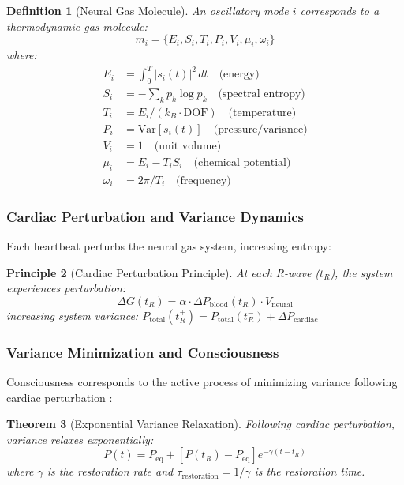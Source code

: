 \documentclass[12pt,twocolumn]{article}
\newtheorem{theorem}{Theorem}[section]
\newtheorem{definition}[theorem]{Definition}
\newtheorem{principle}[theorem]{Principle}
\theoremstyle{remark}
\begin{document}
\begin{definition}[Neural Gas Molecule]
An oscillatory mode $i$ corresponds to a thermodynamic gas molecule:
\begin{equation}
m_i = \{E_i, S_i, T_i, P_i, V_i, \mu_i, \omega_i\}
\end{equation}
where:
\begin{align}
E_i &= \int_0^T |s_i(t)|^2 \, dt \quad \text{(energy)} \\
S_i &= -\sum_k p_k \log p_k \quad \text{(spectral entropy)} \\
T_i &= E_i / (k_B \cdot \text{DOF}) \quad \text{(temperature)} \\
P_i &= \text{Var}[s_i(t)] \quad \text{(pressure/variance)} \\
V_i &= 1 \quad \text{(unit volume)} \\
\mu_i &= E_i - T_i S_i \quad \text{(chemical potential)} \\
\omega_i &= 2\pi/T_i \quad \text{(frequency)}
\end{align}
\end{definition}

\subsubsection{Cardiac Perturbation and Variance Dynamics}

Each heartbeat perturbs the neural gas system, increasing entropy:

\begin{principle}[Cardiac Perturbation Principle]
At each R-wave ($t_R$), the system experiences perturbation:
\begin{equation}
\Delta G(t_R) = \alpha \cdot \Delta P_{\text{blood}}(t_R) \cdot V_{\text{neural}}
\end{equation}
increasing system variance: $P_{\text{total}}(t_R^+) = P_{\text{total}}(t_R^-) + \Delta P_{\text{cardiac}}$
\end{principle}

\subsubsection{Variance Minimization and Consciousness}

Consciousness corresponds to the active process of minimizing variance following cardiac perturbation \citep{bennett1987demons}:

\begin{theorem}[Exponential Variance Relaxation]
Following cardiac perturbation, variance relaxes exponentially:
\begin{equation}
P(t) = P_{\text{eq}} + [P(t_R) - P_{\text{eq}}] e^{-\gamma(t - t_R)}
\end{equation}
where $\gamma$ is the restoration rate and $\tau_{\text{restoration}} = 1/\gamma$ is the restoration time.
\end{theorem}
\end{document}
